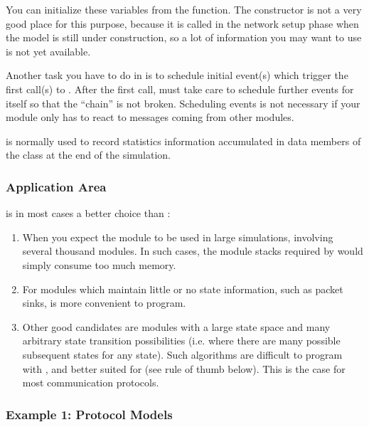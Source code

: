 You can initialize these variables from the 
function.  The constructor is not a very good place
for this purpose, because it is called in the network setup phase when
the model is still under construction, so a lot of information you may
want to use is not yet available.

Another task you have to do in  is to schedule
initial event(s) which trigger the first call(s)
to .  After the first call,
 must take care to schedule further events for
itself so that the ``chain'' is not broken. Scheduling events is not
necessary if your module only has to react to messages coming from
other modules.

 is normally used to record statistics information
accumulated in data members of the class at the end of the simulation.


\subsubsection{Application Area}


 is in most cases a better choice than :

\begin{enumerate}
  \item{When you expect the module to be used in large simulations,
      involving several thousand modules. In such cases, the module stacks
      required by  would simply consume too much memory.}
  \item{For modules which maintain little or no state information,
      such as packet sinks,  is more convenient to program.}
  \item{Other good candidates are modules with a large state space and
      many arbitrary state transition possibilities (i.e. where there
      are many possible subsequent states for any state). Such algorithms
      are difficult to program with , and
      better suited for  (see rule of thumb
      below). This is the case for most communication protocols.}
\end{enumerate}


\subsubsection{Example 1: Protocol Models}

